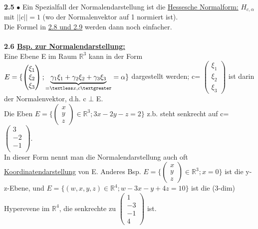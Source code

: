 \documentclass[]{scrartcl}
\begin{document}
\textbf{2.5} $\bullet$ Ein Spezialfall der Normalendarstellung ist die 
\ul{Hessesche Normalform:} $H_{c,\alpha}$ mit \ul{$||c|| = 1$} (wo der 
Normalenvektor auf 1 normiert ist).\\
 Die Formel in  \ul{2.8 und 2.9} werden dann noch einfacher.\\\\
\textbf{ 2.6 \underline{Bsp. zur Normalendarstellung:}}\\ Eine Ebene E im Raum 
$\mathbb{R}^3$ kann in der Form $E = \{\begin{pmatrix} 
 		\xi_1\\
 		\xi_2\\
 		\xi_3
 \end{pmatrix}; \underbrace{\gamma_1\xi_1+\gamma_2\xi_2+\gamma_3\xi_3}_{=\textless x,c \textgreater}= \alpha\}$ dargestellt werden; c= 
$\begin{pmatrix} 
	\xi_1\\
	\xi_2\\
	\xi_3
\end{pmatrix}$ ist darin der Normalenvektor, d.h. c $\bot$ E.\\
Die Eben $E = \{\begin{pmatrix} 
		x\\
		y\\
		z
\end{pmatrix}\in \mathbb{R}^3; 3x-2y-z=2\}$ z.b. steht senkrecht auf c= $\begin{pmatrix} 
3\\
-2\\
-1\\
\end{pmatrix}$.\\
In dieser Form nennt man die Normalendarstellung auch oft  \ul{Koordinatendarstellung} von E. Anderes Bsp.  $E = \{\begin{pmatrix} 
		x\\
		y\\
		z
	\end{pmatrix}\in \mathbb{R}^3; x=0\}$ ist die y-z-Ebene, und  $E = \{(w,x,y,z)\in \mathbb{R}^4; w-3x-y+4z=10\}$ ist die (3-dim) Hyperevene im $\mathbb{R}^4$, die senkrechte zu $\begin{pmatrix}
	1\\
	-3\\
	-1\\
	4
\end{pmatrix}$ ist.\\
\\
\end{document}
